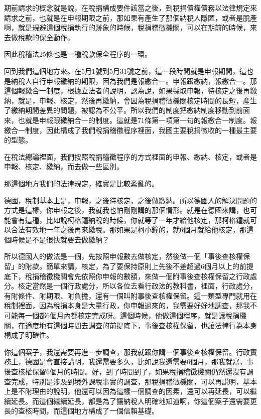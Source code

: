 \documentclass[]{ctexbook}
\begin{document}
期前請求的概念就是說，在稅捐構成要件該當之後，到稅捐債權債務以法律規定來請求之前，也就是在申報期限之前，那如果有產生了那個納稅人隱匿，或者是脫產啊，就是規避這個稅捐執行的跡象的時候，稅捐稽徵機關，可以在期前的時候，來去做稅款的保全動作。

因此稅稽法25條也是一種稅款保全程序的一環。

回到我們這個地方來。在5月1號到5月31號之前，這一段時間就是申報期間，這也是納稅人自行申報繳納的期限，因為我們是報繳合一。申報跟繳納，報繳合一。那這個報繳合一制度，根據立法者的說明，認為說，如果採取申報，待核定之後再繳納，就是，申報、核定，然後再繳納，會因為稅捐稽徵機關核定時間的長短，產生了繳納期間差異的問題，被認為不公平。所以我們的制度把繳納制度移動到前面來，也就是申報跟繳納合一的制度。這就是71條第一項第一句的報繳合一制度。報繳合一制度，因此構成了我們稅捐稽徵程序裡面，我國主要稅捐徵收的一種最主要的型態。

在稅法總論裡面，我們按照稅捐稽徵程序的方式裡面的申報、繳納、核定，或者是申報、核定、繳納，而去做一些區別。

那這個地方我們的法律規定，確實是比較紊亂的。

德國，稅制基本上是，申報，之後待核定，之後做繳納。所以德國人的解決問題的方式是這樣，你申報之後，我就我也怕剛剛講的那個情形。就是在德國來講，也可能會有這種，比如說柯格鐘納稅的時候，你就等了一年才給他核定，那柯格鐘就可以合法有效地一年之後再來繳稅。那如果是柯小鐘的，就6個月就給他核定，那這個時候是不是很快就要去做繳納？

所以德國人的做法是一個，先按照申報數去做核定，然後做一個「事後查核權保留」的附款。簡單來講，核定，為了要保持原則上先後不差超過6個月以上的前提底下，稅捐稽徵機關會先依照你申報的數額，來做一個附事後查核權保留之行政處分。核定當然是一個行政處分，所以各位去看行政法的教科書，裡面，行政處分，有附條件、附期限、附負擔，還有一個叫附事後查核權保留。這一類型專門就用在稅制裡面，因為稅捐本身是大量行政，你申報過來的，我需要好好地調查，那我不可能每一個都6個月內都核定完成呀。這個時候，他做這個程序，就是讓稅捐機關，在適度地有這個時間去調查的前提底下，事後查核權保留，也讓法律行為本身構成了明確性。

你這個案子，我還需要再進一步調查，那我就跟你講一個事後查核權保留。行政實務上，德國是會直接講明，我還需要多久，比如說我還需要6個月，那我就寫，事後查核權保留6個月的時間。好，到了時間到了，如果稅捐稽徵機關仍然還沒有調查完成，特別是涉及到境外課稅事實的調查，那稅捐稽徵機關，可以再説明，基本上是不附理由的說明，他還可以因為這樣一個調查的因素，還可以再延長，可以繼續延長。而這個繼續延長，都是為了讓納稅人明確地知道啊，你這個案子還需要更長的查核時間，而這個地方構成了一個信賴基礎。
\end{document}
